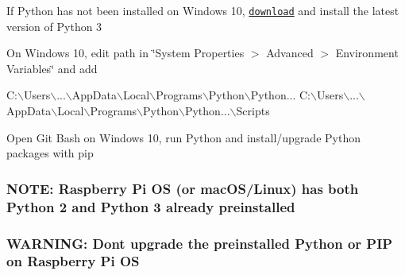 \begin{DoxyItemize}
\item If Python has not been installed on Windows 10, \href{https://www.python.org/downloads/windows/}{\tt download} and install the latest version of Python 3
\item On Windows 10, edit path in \char`\"{}\+System Properties $>$ Advanced $>$ Environment Variables\char`\"{} and add 
\begin{DoxyCode}
C:\(\backslash\)Users\(\backslash\)...\(\backslash\)AppData\(\backslash\)Local\(\backslash\)Programs\(\backslash\)Python\(\backslash\)Python... 
C:\(\backslash\)Users\(\backslash\)...\(\backslash\)AppData\(\backslash\)Local\(\backslash\)Programs\(\backslash\)Python\(\backslash\)Python...\(\backslash\)Scripts
\end{DoxyCode}

\item Open Git Bash on Windows 10, run Python and install/upgrade Python packages with pip 
 \subsubsection*{N\+O\+TE\+: Raspberry Pi OS (or mac\+O\+S/\+Linux) has both Python 2 and Python 3 already preinstalled}
\end{DoxyItemize}

\subsubsection*{W\+A\+R\+N\+I\+NG\+: Don\textquotesingle{}t upgrade the preinstalled Python or P\+IP on Raspberry Pi OS}


